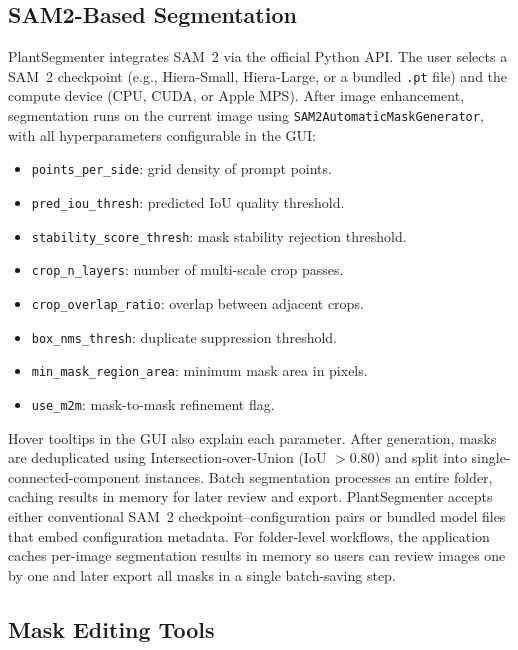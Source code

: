 \documentclass[12pt, a4paper]{article}
\begin{document}
\subsection{SAM2-Based Segmentation}

PlantSegmenter integrates SAM~2 \citep{ravi2024sam2} via the official Python API. The user selects a SAM~2 checkpoint (e.g., Hiera-Small, Hiera-Large, or a bundled \texttt{.pt} file) and the compute device (CPU, CUDA, or Apple MPS). After image enhancement, segmentation runs on the current image using \texttt{SAM2AutomaticMaskGenerator}, with all hyperparameters configurable in the GUI:

\begin{itemize}
    \item \texttt{points\_per\_side}: grid density of prompt points.
    \item \texttt{pred\_iou\_thresh}: predicted IoU quality threshold.
    \item \texttt{stability\_score\_thresh}: mask stability rejection threshold.
    \item \texttt{crop\_n\_layers}: number of multi-scale crop passes.
    \item \texttt{crop\_overlap\_ratio}: overlap between adjacent crops.
    \item \texttt{box\_nms\_thresh}: duplicate suppression threshold.
    \item \texttt{min\_mask\_region\_area}: minimum mask area in pixels.
    \item \texttt{use\_m2m}: mask-to-mask refinement flag.
\end{itemize}

Hover tooltips in the GUI also explain each parameter. After generation, masks are deduplicated using Intersection-over-Union (IoU $> 0.80$) and split into single-connected-component instances. Batch segmentation processes an entire folder, caching results in memory for later review and export. PlantSegmenter accepts either conventional SAM~2 checkpoint--configuration pairs or bundled model files that embed configuration metadata. For folder-level workflows, the application caches per-image segmentation results in memory so users can review images one by one and later export all masks in a single batch-saving step.

\subsection{Mask Editing Tools}
\end{document}
